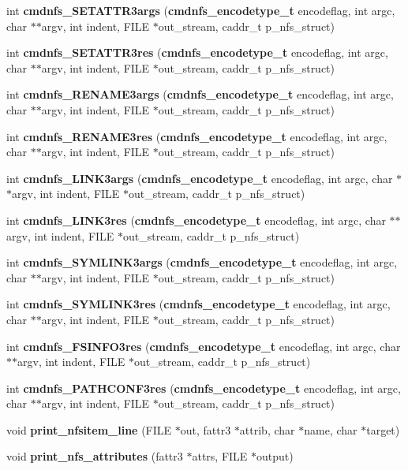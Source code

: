 \begin{CompactItemize}
\item 
int {\bf cmdnfs\_\-SETATTR3args} ({\bf cmdnfs\_\-encodetype\_\-t} encodeflag, int argc, char $\ast$$\ast$argv, int indent, FILE $\ast$out\_\-stream, caddr\_\-t p\_\-nfs\_\-struct)
\item 
int {\bf cmdnfs\_\-SETATTR3res} ({\bf cmdnfs\_\-encodetype\_\-t} encodeflag, int argc, char $\ast$$\ast$argv, int indent, FILE $\ast$out\_\-stream, caddr\_\-t p\_\-nfs\_\-struct)
\item 
int {\bf cmdnfs\_\-RENAME3args} ({\bf cmdnfs\_\-encodetype\_\-t} encodeflag, int argc, char $\ast$$\ast$argv, int indent, FILE $\ast$out\_\-stream, caddr\_\-t p\_\-nfs\_\-struct)
\item 
int {\bf cmdnfs\_\-RENAME3res} ({\bf cmdnfs\_\-encodetype\_\-t} encodeflag, int argc, char $\ast$$\ast$argv, int indent, FILE $\ast$out\_\-stream, caddr\_\-t p\_\-nfs\_\-struct)
\item 
int {\bf cmdnfs\_\-LINK3args} ({\bf cmdnfs\_\-encodetype\_\-t} encodeflag, int argc, char $\ast$$\ast$argv, int indent, FILE $\ast$out\_\-stream, caddr\_\-t p\_\-nfs\_\-struct)
\item 
int {\bf cmdnfs\_\-LINK3res} ({\bf cmdnfs\_\-encodetype\_\-t} encodeflag, int argc, char $\ast$$\ast$argv, int indent, FILE $\ast$out\_\-stream, caddr\_\-t p\_\-nfs\_\-struct)
\item 
int {\bf cmdnfs\_\-SYMLINK3args} ({\bf cmdnfs\_\-encodetype\_\-t} encodeflag, int argc, char $\ast$$\ast$argv, int indent, FILE $\ast$out\_\-stream, caddr\_\-t p\_\-nfs\_\-struct)
\item 
int {\bf cmdnfs\_\-SYMLINK3res} ({\bf cmdnfs\_\-encodetype\_\-t} encodeflag, int argc, char $\ast$$\ast$argv, int indent, FILE $\ast$out\_\-stream, caddr\_\-t p\_\-nfs\_\-struct)
\item 
int {\bf cmdnfs\_\-FSINFO3res} ({\bf cmdnfs\_\-encodetype\_\-t} encodeflag, int argc, char $\ast$$\ast$argv, int indent, FILE $\ast$out\_\-stream, caddr\_\-t p\_\-nfs\_\-struct)
\item 
int {\bf cmdnfs\_\-PATHCONF3res} ({\bf cmdnfs\_\-encodetype\_\-t} encodeflag, int argc, char $\ast$$\ast$argv, int indent, FILE $\ast$out\_\-stream, caddr\_\-t p\_\-nfs\_\-struct)
\item 
void {\bf print\_\-nfsitem\_\-line} (FILE $\ast$out, fattr3 $\ast$attrib, char $\ast$name, char $\ast$target)
\item 
void {\bf print\_\-nfs\_\-attributes} (fattr3 $\ast$attrs, FILE $\ast$output)
\end{CompactItemize}


